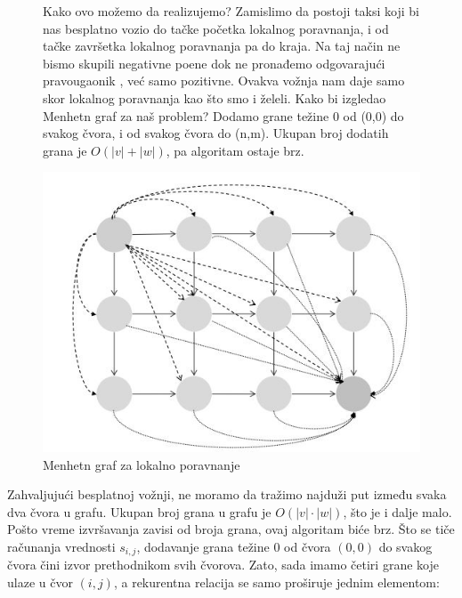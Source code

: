 \begin{figure}[H]
     \begin{minipage}{0.39\textwidth}
        Kako ovo možemo da realizujemo? Zamislimo da postoji taksi koji bi nas besplatno vozio do tačke početka lokalnog poravnanja, i od tačke završetka lokalnog poravnanja pa do kraja. Na taj način ne bismo skupili negativne poene dok ne pronađemo odgovarajući pravougaonik , već samo pozitivne. Ovakva vožnja nam daje samo skor lokalnog poravnanja kao što smo i želeli. Kako bi izgledao Menhetn graf za naš problem? Dodamo grane težine 0 od (0,0) do svakog čvora, i od svakog čvora do (n,m). Ukupan broj dodatih grana je $O(|v|+|w|)$, pa algoritam ostaje brz.
     \end{minipage}
     \hfill
     \begin{minipage}{0.49\textwidth}
       \includegraphics[width=\linewidth]{poglavlja/5/slike/free_taxi_graf.JPG}
       \caption{Menhetn graf za lokalno poravnanje}\label{}
    \end{minipage}
\end{figure}


Zahvaljujući besplatnoj vožnji, ne moramo da tražimo najduži put između svaka dva čvora u grafu. Ukupan broj grana u grafu je $O(|v| \cdot |w|)$, što je i dalje malo. Pošto vreme izvršavanja zavisi od broja grana, ovaj algoritam biće brz. Što se tiče računanja vrednosti $s_{i, j}$, dodavanje grana težine 0 od čvora $(0, 0)$ do svakog čvora čini izvor prethodnikom svih čvorova. Zato, sada imamo četiri grane koje ulaze u čvor $(i, j)$, a rekurentna relacija se samo proširuje jednim elementom:

